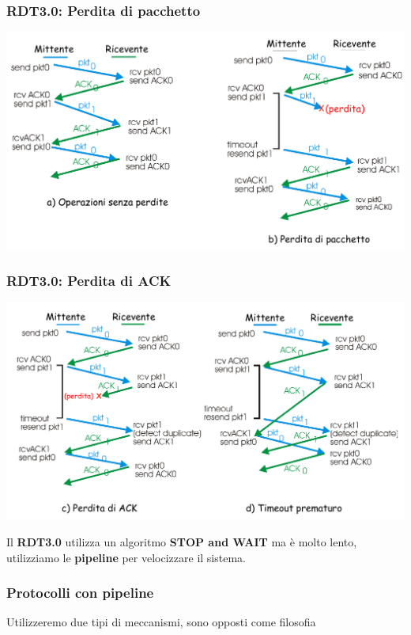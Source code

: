 \subsubsection*{RDT3.0: Perdita di pacchetto}
\includegraphics[width=\textwidth]{./img/rdt3.01.png} \newline

\subsubsection*{RDT3.0: Perdita di ACK}
\includegraphics[width=\textwidth]{./img/rdt3.02.png} \newline

Il \textbf{RDT3.0} utilizza un algoritmo \textbf{STOP and WAIT} ma è molto lento, utilizziamo le \textbf{pipeline} per velocizzare il sistema. 

\subsubsection{Protocolli con pipeline}
Utilizzeremo due tipi di meccanismi, sono opposti come filosofia

